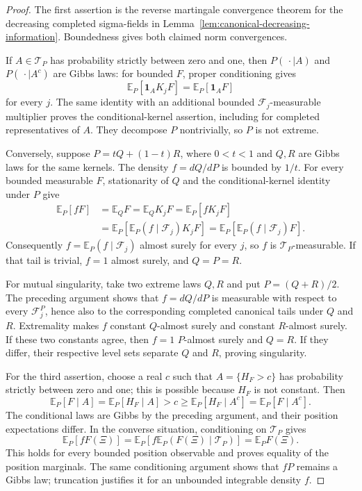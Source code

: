 \documentclass[11pt,a4paper]{article}
\numberwithin{equation}{section}
\theoremstyle{definition}
\theoremstyle{remark}
\newcommand{\E}{\mathbb E}
\begin{document}
\begin{proof}
The first assertion is the reverse martingale convergence theorem for
the decreasing completed sigma-fields in
Lemma~\ref{lem:canonical-decreasing-information}. Boundedness gives
both claimed norm convergences.

If $A\in\mathcal T_P$ has probability strictly between zero and one,
then $P(\,\cdot\mid A)$ and $P(\,\cdot\mid A^c)$ are Gibbs laws:
for bounded $F$, proper conditioning gives
\[
 \E_P[\mathbf1_AK_jF]=\E_P[\mathbf1_AF]
\]
for every $j$. The same identity with an additional bounded
$\mathcal F_j$-measurable multiplier proves the conditional-kernel
assertion, including for completed representatives of $A$.
They decompose $P$ nontrivially, so $P$ is not extreme.

Conversely, suppose $P=tQ+(1-t)R$, where $0<t<1$ and $Q,R$ are
Gibbs laws for the same kernels. The density $f=dQ/dP$ is bounded
by $1/t$. For every bounded measurable $F$, stationarity of $Q$
and the conditional-kernel identity under $P$ give
\begin{align*}
 \E_P[fF]
 &=\E_QF=\E_QK_jF
   =\E_P[fK_jF]\\
 &=\E_P[\E_P(f\mid\mathcal F_j)K_jF]
   =\E_P[\E_P(f\mid\mathcal F_j)F].
\end{align*}
Consequently $f=\E_P(f\mid\mathcal F_j)$ almost surely for every
$j$, so $f$ is $\mathcal T_P$-measurable. If that tail is trivial,
$f=1$ almost surely, and $Q=P=R$.

For mutual singularity, take two extreme laws $Q,R$ and put
$P=(Q+R)/2$. The preceding argument shows that $f=dQ/dP$ is
measurable with respect to every $\mathcal F_j^P$, hence also to
the corresponding completed canonical tails under $Q$ and $R$.
Extremality makes $f$ constant $Q$-almost surely and constant
$R$-almost surely. If these two constants agree, then $f=1$
$P$-almost surely and $Q=R$. If they differ, their respective
level sets separate $Q$ and $R$, proving singularity.

For the third assertion, choose a real $c$ such that
$A=\{H_F>c\}$ has probability strictly between zero and one; this
is possible because $H_F$ is not constant. Then
\[
 \E_P[F\mid A]=\E_P[H_F\mid A]>c
 \ge\E_P[H_F\mid A^c]=\E_P[F\mid A^c].
\]
The conditional laws are Gibbs by the preceding argument, and their
position expectations differ. In the converse situation, conditioning
on $\mathcal T_P$ gives
\[
 \E_P[fF(\Xi)]=\E_P[f\E_P(F(\Xi)\mid\mathcal T_P)]
             =\E_PF(\Xi).
\]
This holds for every bounded position observable and proves equality
of the position marginals. The same conditioning argument shows that
$fP$ remains a Gibbs law; truncation justifies it for an unbounded
integrable density $f$.
\end{proof}
\end{document}
